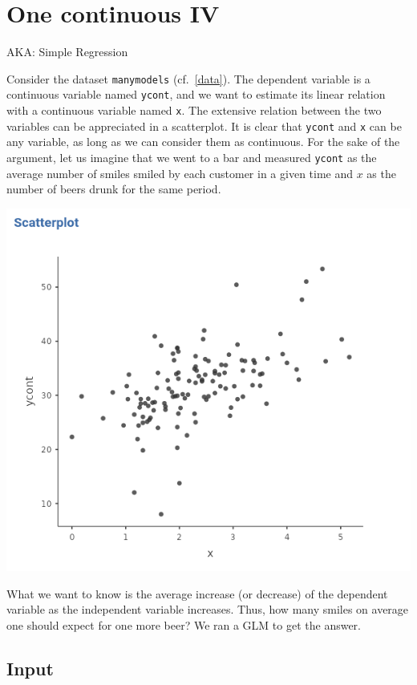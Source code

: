 \documentclass[
]{book}
\begin{document}
\hypertarget{regression}{%
\section{One continuous IV}\label{regression}}

\begin{flushright} AKA: Simple Regression  \end{flushright}

Consider the dataset \texttt{manymodels} (cf.~\ref{data}). The dependent variable is a continuous variable named \texttt{ycont}, and we want to estimate its linear relation with a continuous variable named \texttt{x}. The extensive relation between the two variables can be appreciated in a scatterplot. It is clear that \texttt{ycont} and \texttt{x} can be any variable, as long as we can consider them as continuous. For the sake of the argument, let us imagine that we went to a bar and measured \texttt{ycont} as the average number of smiles smiled by each customer in a given time and \(x\) as the number of beers drunk for the same period.

\includegraphics[width=0.9\linewidth]{bookletpics/2_scatterplot1}

What we want to know is the average increase (or decrease) of the dependent variable as the independent variable increases. Thus, how many smiles on average one should expect for one more beer? We ran a GLM to get the answer.

\hypertarget{glminput}{%
\subsection{Input}\label{glminput}}
\end{document}
